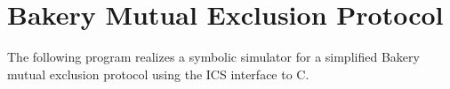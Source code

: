 \documentclass[12pt]{article}
\begin{document}



\appendix

\section{Bakery Mutual Exclusion Protocol}\label{app:bakery}

The following program realizes a symbolic simulator
for a simplified Bakery mutual exclusion protocol
using the ICS interface to C.




% 
\end{document}
